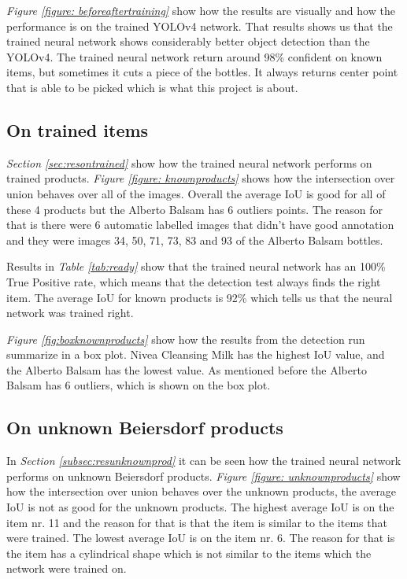 \textit{Figure \ref{figure: beforeaftertraining}} show how the results are visually and how the performance is on the trained YOLOv4 network. That results shows us that the trained neural network shows considerably better object detection than the YOLOv4. The trained neural network return around 98\% confident on known items, but sometimes it cuts a piece of the bottles. It always returns center point that is able to be picked which is what this project is about. 


\subsection{On trained items}
\textit{Section \ref{sec:resontrained}} show how the trained neural network performs on trained products. \textit{Figure \ref{figure: knownproducts}} shows how the intersection over union behaves over all of the images. Overall the average IoU is good for all of these 4 products but the Alberto Balsam has 6 outliers points. The reason for that is there were 6 automatic labelled images that didn't have good annotation and they were images 34, 50, 71, 73, 83 and 93 of the Alberto Balsam bottles.

Results in \textit{Table \ref{tab:ready}} show that the trained neural network has an 100\% True Positive rate, which means that the detection test always finds the right item. The average IoU for known products is 92\% which tells us that the neural network was trained right.

\textit{Figure \ref{fig:boxknownproducts}} show how the results from the detection run summarize in a box plot. Nivea Cleansing Milk has the highest IoU value, and the Alberto Balsam has the lowest value. As mentioned before the Alberto Balsam has 6 outliers, which is shown on the box plot.

\subsection{On unknown Beiersdorf products}
In \textit{Section \ref{subsec:resunknownprod}} it can be seen how the trained neural network performs on unknown Beiersdorf products. \textit{Figure \ref{figure: unknownproducts}} show how the intersection over union behaves over the unknown products, the average IoU is not as good for the unknown products. The highest average IoU is on the item nr. 11 and the reason for that is that the item is similar to the items that were trained. The lowest average IoU is on the item nr. 6. The reason for that is the item has a cylindrical shape which is not similar to the items which the network were trained on.  

